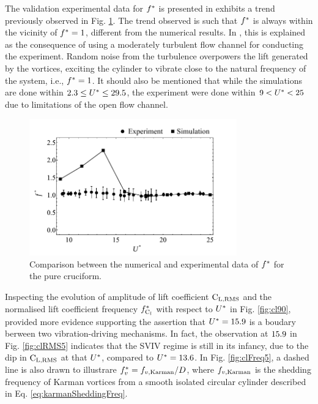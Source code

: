 \documentclass[oneside]{utmthesis}
\begin{document}
The validation experimental data for $f^{*}$ is presented in exhibits a trend previously observed in Fig. \ref{fig:expSimFreq90}. The trend observed is such that $f^{*}$ is always within the vicinity of $f^{*} = 1$, different from the numerical results. In \citet{Nguyen2012}, this is explained as the consequence of using a moderately turbulent flow channel for conducting the experiment. Random noise from the turbulence overpowers the lift generated by the vortices, exciting the cylinder to vibrate close to the natural frequency of the system, i.e., $f^{*} = 1$. It should also be mentioned that while the simulations are done within $2.3 \leq U^{*} \leq 29.5$, the experiment were done within $9 < U^{*} < 25$ due to limitations of the open flow channel.

\begin{figure}[H]
  \centering
  \includegraphics[width=0.8\textwidth]{figs/expSimFreq90}
  \caption{Comparison between the numerical and experimental data of $f^{*}$ for the pure cruciform.}
  \label{fig:expSimFreq90}
\end{figure}

Inspecting the evolution of \rms{} amplitude of lift coefficient $\text{C}_{\text{L,RMS}}$ and the normalised lift coefficient frequency $f_{\text{C}_{l}}^{*}$ with respect to $U^{*}$ in Fig. \ref{fig:cl90}, provided more evidence supporting the assertion that $U^{*} = 15.9$ is a boudary berween two vibration-driving mechanisms. In fact, the observation at $15.9$ in Fig. \ref{fig:clRMS5} indicates that the SVIV regime is still in its infancy, due to the dip in $\text{C}_{\text{L,RMS}}$ at that $U^{*}$, compared to $U^{*} = 13.6$. In Fig. \ref{fig:clFreq5}, a dashed line is also drawn to illustrare $f^{*}_{v} = f_{v,\text{Karman}}/D$, where $f_{v,\text{Karman}}$ is the shedding frequency of Karman vortices from a smooth isolated circular cylinder described in Eq. \ref{eq:karmanSheddingFreq}.
\end{document}
